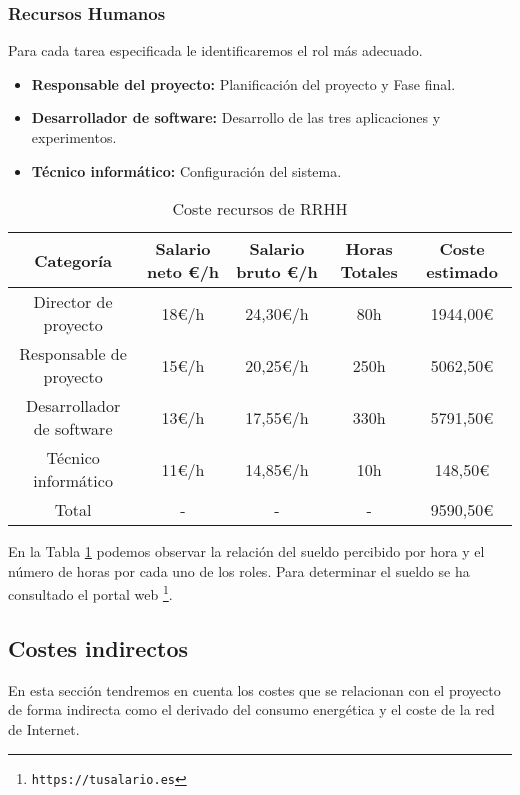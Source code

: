\documentclass[titlepage,10.5pt]{report}
\begin{document}
\subsubsection{Recursos Humanos}


Para cada tarea especificada le identificaremos el rol más adecuado. 
\begin{itemize}
	\item \textbf{Responsable del proyecto:} Planificación del proyecto y Fase final.
	\item \textbf{Desarrollador de software:} Desarrollo de las tres aplicaciones y experimentos.
	\item \textbf{Técnico informático:} Configuración del sistema.
\end{itemize}

\begin{table}[H]
	\centering
	\begin{tabular}{|c|c|c|c|c|}
		\hline
		\textbf{Categoría} & \textbf{Salario neto €/h} & \textbf{Salario bruto €/h} & \textbf{Horas Totales} & \textbf{Coste estimado} \\ \hline \hline
		Director de proyecto 	  & 18€/h & 24,30€/h & 80h  & 1944,00€ \\ \hline
		Responsable de proyecto   & 15€/h & 20,25€/h & 250h & 5062,50€ \\ \hline
		Desarrollador de software & 13€/h & 17,55€/h & 330h & 5791,50€ \\ \hline
		Técnico informático 	  & 11€/h & 14,85€/h & 10h  &  148,50€ \\ \hline \hline			
		Total 					  & - 	  & - 		 & -    & 9590,50€ \\ \hline
	\end{tabular}
	\caption{Coste recursos de RRHH}
	\label{rrhh_1}
\end{table}

En la Tabla \ref{rrhh_1} podemos observar la relación del sueldo percibido por hora y el número de horas por cada uno de los roles. Para determinar el sueldo se ha consultado el portal web \footnote{\texttt{https://tusalario.es}}.

\subsection{Costes indirectos}

En esta sección tendremos en cuenta los costes que se relacionan con el proyecto de forma indirecta como el derivado del consumo energética y el coste de la red de Internet.
\end{document}
